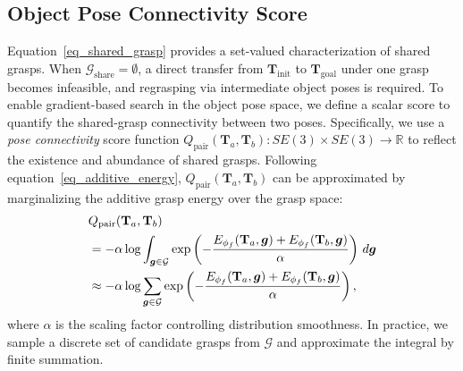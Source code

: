 \documentclass[journal, twoside]{IEEEtran}
\newif\ifshownotes
\newcommand{\lqin}[1]{\ifshownotes{\color{darkgreen}\begin{CJK*}{UTF8}{gkai}\small#1\end{CJK*}}\fi}
\begin{document}
\subsection{Object Pose Connectivity Score}
Equation~\eqref{eq_shared_grasp} provides a set-valued characterization of shared grasps. When $\mathcal{G}_{\mathrm{share}}=\emptyset$, a direct transfer from $\mathbf{T}_{\mathrm{init}}$ to $\mathbf{T}_{\mathrm{goal}}$ under one grasp becomes infeasible, and regrasping via intermediate object poses is required. To enable gradient-based search in the object pose space, we define a scalar score to quantify the shared-grasp connectivity between two poses. Specifically, we use a \textit{pose connectivity} score function $Q_\mathrm{pair}(\mathbf{T}_a,\mathbf{T}_b): SE(3)\times SE(3) \rightarrow \mathbb{R}$ to reflect the existence and abundance of shared grasps. Following equation~\eqref{eq_additive_energy}, $Q_\mathrm{pair}(\mathbf{T}_a,\mathbf{T}_b)$ can be approximated by marginalizing the additive grasp energy over the grasp space:
\begin{align}
    &Q_\mathrm{pair}(\mathbf{T}_a, \mathbf{T}_b)\nonumber\\
    &= -\alpha \log \int_{\boldsymbol{g}\in\mathcal{G}} \exp \left( -\frac{E_{\phi_f}(\mathbf{T}_a, \boldsymbol{g}) + E_{\phi_f}(\mathbf{T}_b, \boldsymbol{g})}{\alpha} \right) \, d\boldsymbol{g} \notag \\
    &\approx -\alpha \log \sum_{\boldsymbol{g} \in \mathcal{G}} \exp \left( -\frac{E_{\phi_f}(\mathbf{T}_a, \boldsymbol{g}) + E_{\phi_f}(\mathbf{T}_b, \boldsymbol{g})}{\alpha} \right),
    \label{eq_free_energy_link}
\end{align}
where $\alpha$ is the scaling factor controlling distribution smoothness. In practice, we sample a discrete set of candidate grasps from $\mathcal{G}$ and approximate the integral by finite summation.
\end{document}
